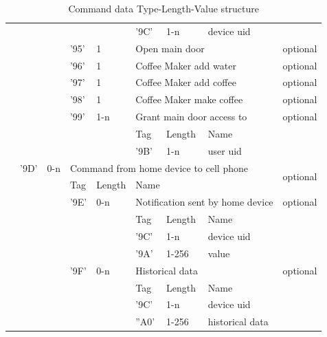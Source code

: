 \begin{table}[!htbp]
{\begin{tabular}{|l|l|l|l|l|l|l|l|l|l|}
\multicolumn{2}{|l|}{} & \multicolumn{2}{l|}{} & \multicolumn{2}{l|}{} & '9C' & 1-n & device uid &  \\ \cline{5-10} 
\multicolumn{2}{|l|}{} & \multicolumn{2}{l|}{} & '95' & 1 & \multicolumn{3}{l|}{Open main door} & optional \\ \cline{5-10} 
\multicolumn{2}{|l|}{} & \multicolumn{2}{l|}{} & '96' & 1 & \multicolumn{3}{l|}{Coffee Maker add water} & optional \\ \cline{5-10} 
\multicolumn{2}{|l|}{} & \multicolumn{2}{l|}{} & '97' & 1 & \multicolumn{3}{l|}{Coffee Maker add coffee} & optional \\ \cline{5-10} 
\multicolumn{2}{|l|}{} & \multicolumn{2}{l|}{} & '98' & 1 & \multicolumn{3}{l|}{Coffee Maker make coffee} & optional \\ \cline{5-10} 
\multicolumn{2}{|l|}{} & \multicolumn{2}{l|}{} & '99' & 1-n & \multicolumn{3}{l|}{Grant main door access to} & optional \\ \cline{5-10} 
\multicolumn{2}{|l|}{} & \multicolumn{2}{l|}{} & \multicolumn{2}{l|}{\multirow{2}{*}{}} & Tag & Length & Name & \multirow{2}{*}{} \\ \cline{7-9}
\multicolumn{2}{|l|}{} & \multicolumn{2}{l|}{} & \multicolumn{2}{l|}{} & '9B' & 1-n & user uid &  \\ \cline{3-10} 
\multicolumn{2}{|l|}{} & '9D' & 0-n & \multicolumn{5}{l|}{Command from home device to cell phone} & \multirow{2}{*}{optional} \\ \cline{3-9}
\multicolumn{2}{|l|}{} & \multicolumn{2}{l|}{\multirow{9}{*}{}} & Tag & Length & \multicolumn{3}{l|}{Name} &  \\ \cline{5-10} 
\multicolumn{2}{|l|}{} & \multicolumn{2}{l|}{} & '9E' & 0-n & \multicolumn{3}{l|}{Notification sent by home device} & optional \\ \cline{5-10} 
\multicolumn{2}{|l|}{} & \multicolumn{2}{l|}{} & \multicolumn{2}{l|}{\multirow{3}{*}{}} & Tag & Length & Name & \multirow{3}{*}{} \\ \cline{7-9}
\multicolumn{2}{|l|}{} & \multicolumn{2}{l|}{} & \multicolumn{2}{l|}{} & '9C' & 1-n & device uid &  \\ \cline{7-9}
\multicolumn{2}{|l|}{} & \multicolumn{2}{l|}{} & \multicolumn{2}{l|}{} & '9A' & 1-256 & value &  \\ \cline{5-10} 
\multicolumn{2}{|l|}{} & \multicolumn{2}{l|}{} & '9F' & 0-n & \multicolumn{3}{l|}{Historical data} & optional \\ \cline{5-10} 
\multicolumn{2}{|l|}{} & \multicolumn{2}{l|}{} & \multicolumn{2}{l|}{\multirow{3}{*}{}} & Tag & Length & Name & \multirow{3}{*}{} \\ \cline{7-9}
\multicolumn{2}{|l|}{} & \multicolumn{2}{l|}{} & \multicolumn{2}{l|}{} & '9C' & 1-n & device uid &  \\ \cline{7-9}
\multicolumn{2}{|l|}{} & \multicolumn{2}{l|}{} & \multicolumn{2}{l|}{} & ''A0' & 1-256 & historical data &  \\ \hline
\end{tabular}
}
\caption{Command data Type-Length-Value structure}
\label{tlv}
\end{table}
